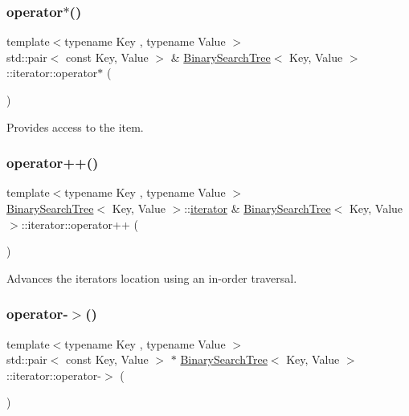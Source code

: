 \subsubsection{\texorpdfstring{operator$\ast$()}{operator*()}}
{\footnotesize\ttfamily template$<$typename Key , typename Value $>$ \\
std\+::pair$<$ const Key, Value $>$ \& \mbox{\hyperlink{classBinarySearchTree}{Binary\+Search\+Tree}}$<$ Key, Value $>$\+::iterator\+::operator$\ast$ (\begin{DoxyParamCaption}{ }\end{DoxyParamCaption})}

Provides access to the item. \mbox{\label{classBinarySearchTree_1_1iterator_a9ed876ed9daa9319fa7260453c522d9c}} 
\subsubsection{\texorpdfstring{operator++()}{operator++()}}
{\footnotesize\ttfamily template$<$typename Key , typename Value $>$ \\
\mbox{\hyperlink{classBinarySearchTree}{Binary\+Search\+Tree}}$<$ Key, Value $>$\+::\mbox{\hyperlink{classBinarySearchTree_1_1iterator}{iterator}} \& \mbox{\hyperlink{classBinarySearchTree}{Binary\+Search\+Tree}}$<$ Key, Value $>$\+::iterator\+::operator++ (\begin{DoxyParamCaption}{ }\end{DoxyParamCaption})}

Advances the iterator\textquotesingle{}s location using an in-\/order traversal. \mbox{\label{classBinarySearchTree_1_1iterator_ad9c6b267bae9a150f05290f15e7d78fb}} 
\subsubsection{\texorpdfstring{operator-\/$>$()}{operator->()}}
{\footnotesize\ttfamily template$<$typename Key , typename Value $>$ \\
std\+::pair$<$ const Key, Value $>$ $\ast$ \mbox{\hyperlink{classBinarySearchTree}{Binary\+Search\+Tree}}$<$ Key, Value $>$\+::iterator\+::operator-\/$>$ (\begin{DoxyParamCaption}{ }\end{DoxyParamCaption})}

